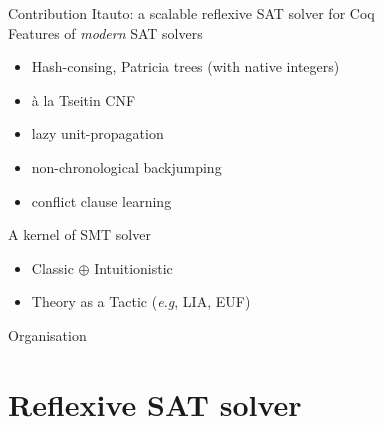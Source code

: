 \documentclass{beamer}
\begin{document}
\begin{frame}{Contribution}
  Itauto: a scalable reflexive SAT solver for Coq\\

  Features of \emph{modern} SAT solvers
  \begin{itemize}
  \item Hash-consing, Patricia trees (with native integers)
  \item à la Tseitin CNF
  \item lazy unit-propagation
  \item non-chronological backjumping
  \item conflict clause learning
  \end{itemize}
  \bigskip
  
  A kernel of SMT solver %
  \begin{itemize}
  \item Classic $\oplus$ Intuitionistic
  \item Theory as a Tactic (\emph{e.g}, LIA, EUF)
  \end{itemize}
  
\end{frame}

\begin{frame}{Organisation}
  \tableofcontents
\end{frame}

\section{Reflexive SAT solver}



\end{document}
